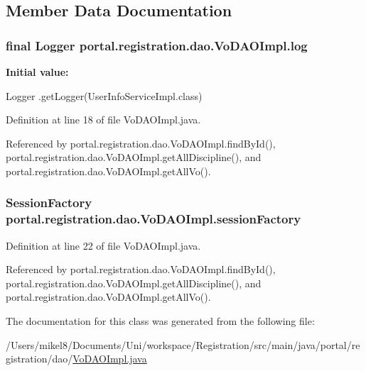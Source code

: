 \subsection{Member Data Documentation}
\hypertarget{classportal_1_1registration_1_1dao_1_1VoDAOImpl_aabbe1e1ee26e5a1a2b13c6d49b77449f}{
\subsubsection[{log}]{\setlength{\rightskip}{0pt plus 5cm}final Logger {\bf portal.registration.dao.VoDAOImpl.log}}}
\label{classportal_1_1registration_1_1dao_1_1VoDAOImpl_aabbe1e1ee26e5a1a2b13c6d49b77449f}
{\bfseries Initial value:}
\begin{DoxyCode}
 Logger
                        .getLogger(UserInfoServiceImpl.class)
\end{DoxyCode}


Definition at line 18 of file VoDAOImpl.java.



Referenced by portal.registration.dao.VoDAOImpl.findById(), portal.registration.dao.VoDAOImpl.getAllDiscipline(), and portal.registration.dao.VoDAOImpl.getAllVo().

\hypertarget{classportal_1_1registration_1_1dao_1_1VoDAOImpl_ac5ec3502e9e6c89e2545a21c355d5b9d}{
\subsubsection[{sessionFactory}]{\setlength{\rightskip}{0pt plus 5cm}SessionFactory {\bf portal.registration.dao.VoDAOImpl.sessionFactory}}}
\label{classportal_1_1registration_1_1dao_1_1VoDAOImpl_ac5ec3502e9e6c89e2545a21c355d5b9d}


Definition at line 22 of file VoDAOImpl.java.



Referenced by portal.registration.dao.VoDAOImpl.findById(), portal.registration.dao.VoDAOImpl.getAllDiscipline(), and portal.registration.dao.VoDAOImpl.getAllVo().



The documentation for this class was generated from the following file:\begin{DoxyCompactItemize}
\item 
/Users/mikel8/Documents/Uni/workspace/Registration/src/main/java/portal/registration/dao/\hyperlink{VoDAOImpl_8java}{VoDAOImpl.java}\end{DoxyCompactItemize}
